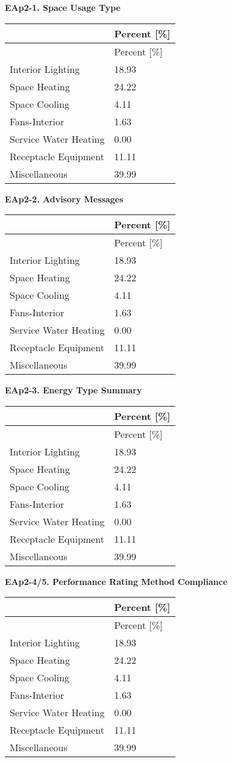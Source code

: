 \textbf{EAp2-1. Space Usage Type}

\begin{longtable}[c]{@{}ll@{}}
\toprule 
 & Percent [\%] \tabularnewline
\midrule
\endfirsthead

\toprule 
 & Percent [\%] \tabularnewline
\midrule
\endhead

Interior Lighting & 18.93 \tabularnewline
Space Heating & 24.22 \tabularnewline
Space Cooling & 4.11 \tabularnewline
Fans-Interior & 1.63 \tabularnewline
Service Water Heating & 0.00 \tabularnewline
Receptacle Equipment & 11.11 \tabularnewline
Miscellaneous & 39.99 \tabularnewline
\bottomrule
\end{longtable}

\textbf{EAp2-2. Advisory Messages}

\begin{longtable}[c]{@{}ll@{}}
\toprule 
 & Percent [\%] \tabularnewline
\midrule
\endfirsthead

\toprule 
 & Percent [\%] \tabularnewline
\midrule
\endhead

Interior Lighting & 18.93 \tabularnewline
Space Heating & 24.22 \tabularnewline
Space Cooling & 4.11 \tabularnewline
Fans-Interior & 1.63 \tabularnewline
Service Water Heating & 0.00 \tabularnewline
Receptacle Equipment & 11.11 \tabularnewline
Miscellaneous & 39.99 \tabularnewline
\bottomrule
\end{longtable}

\textbf{EAp2-3. Energy Type Summary}

\begin{longtable}[c]{@{}ll@{}}
\toprule 
 & Percent [\%] \tabularnewline
\midrule
\endfirsthead

\toprule 
 & Percent [\%] \tabularnewline
\midrule
\endhead

Interior Lighting & 18.93 \tabularnewline
Space Heating & 24.22 \tabularnewline
Space Cooling & 4.11 \tabularnewline
Fans-Interior & 1.63 \tabularnewline
Service Water Heating & 0.00 \tabularnewline
Receptacle Equipment & 11.11 \tabularnewline
Miscellaneous & 39.99 \tabularnewline
\bottomrule
\end{longtable}

\textbf{EAp2-4/5. Performance Rating Method Compliance}

\begin{longtable}[c]{@{}ll@{}}
\toprule 
 & Percent [\%] \tabularnewline
\midrule
\endfirsthead

\toprule 
 & Percent [\%] \tabularnewline
\midrule
\endhead

Interior Lighting & 18.93 \tabularnewline
Space Heating & 24.22 \tabularnewline
Space Cooling & 4.11 \tabularnewline
Fans-Interior & 1.63 \tabularnewline
Service Water Heating & 0.00 \tabularnewline
Receptacle Equipment & 11.11 \tabularnewline
Miscellaneous & 39.99 \tabularnewline
\bottomrule
\end{longtable}

